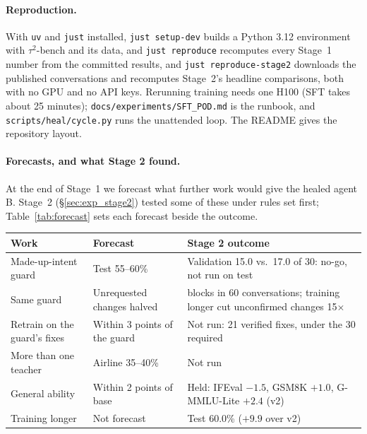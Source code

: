 \documentclass[11pt]{article}
\begin{document}
\paragraph{Reproduction.} With \texttt{uv} and \texttt{just} installed, \texttt{just setup-dev} builds a Python 3.12 environment with $\tau^2$-bench and its data, and \texttt{just reproduce} recomputes every Stage~1 number from the committed results, and \texttt{just reproduce-stage2} downloads the published conversations and recomputes Stage~2's headline comparisons, both with no GPU and no API keys. Rerunning training needs one H100 (SFT takes about 25 minutes); \texttt{docs/experiments/SFT\_POD.md} is the runbook, and \texttt{scripts/heal/cycle.py} runs the unattended loop. The README gives the repository layout.

\paragraph{Forecasts, and what Stage 2 found.} At the end of Stage~1 we forecast what further work would give the healed agent B. Stage~2 (\S\ref{sec:exp_stage2}) tested some of these under rules set first; Table~\ref{tab:forecast} sets each forecast beside the outcome.

\par\smallskip\noindent
{\centering\footnotesize\setlength{\tabcolsep}{3pt}%
\begin{tabular}{@{}>{\raggedright\arraybackslash}p{2.0cm}>{\raggedright\arraybackslash}p{1.8cm}>{\raggedright\arraybackslash}p{3.2cm}@{}}
\toprule
\textbf{Work} & \textbf{Forecast} & \textbf{Stage 2 outcome} \\
\midrule
Made-up-intent guard & Test 55--60\% & Validation 15.0 vs.\ 17.0 of 30: no-go, not run on test \\
Same guard & Unrequested changes halved & 5 blocks in 60 conversations; training longer cut unconfirmed changes 15$\times$ \\
Retrain on the guard's fixes & Within 3 points of the guard & Not run: 21 verified fixes, under the 30 required \\
More than one teacher & Airline 35--40\% & Not run \\
General ability & Within 2 points of base & Held: IFEval $-1.5$, GSM8K $+1.0$, G-MMLU-Lite $+2.4$ (v2) \\
Training longer & Not forecast & Test 60.0\% ($+9.9$ over v2) \\
\bottomrule
\end{tabular}
\label{tab:forecast}\par}
\smallskip
\end{document}

